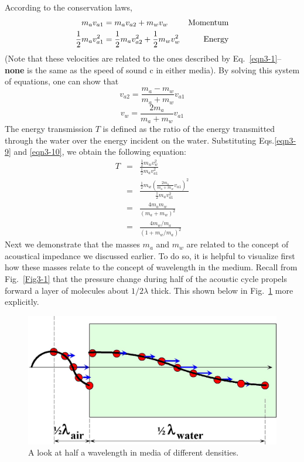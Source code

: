According to the conservation laws,
\begin{align}
m_av_{a1} &= m_av_{a2} + m_wv_w &{\rm Momentum}\nonumber\\
\frac{1}{2}m_av_{a1}^2 &= \frac{1}{2}m_av_{a2}^2 + \frac{1}{2}m_wv_w^2 &{\rm Energy}\nonumber
\end{align}
(Note that these velocities are related to the ones described by Eq.~\ref{eqn3-1}-- {\bf none} is the same as the speed of sound c in either media).  By solving this system of equations, one can show that
\begin{equation}\label{eqn3-9}
	v_{a2}=\frac{m_a-m_w}{m_a+m_w}v_{a1}
\end{equation}
\begin{equation}\label{eqn3-10}
	v_w=\frac{2m_a}{m_a+m_w}v_{a1}
\end{equation}
The energy transmission $T$ is defined as the ratio of the energy transmitted through the water over the energy incident on the water.  Substituting Eqs.\ref{eqn3-9} and \ref{eqn3-10}, we obtain the following equation:
\begin{eqnarray}\label{eqn3-11}
T &=& \frac{\frac{1}{2}m_wv_w^2}{\frac{1}{2}m_av_{a1}^2}\nonumber\\
&=& \frac{\frac{1}{2}m_w\left(\frac{2m_a}{m_a+m_w}v_{a1}\right)^2}{\frac{1}{2}m_av_{a1}^2}\nonumber\\
&=& \frac{4 m_a m_w}{\left(m_a+m_w\right)^2}\nonumber\\
&=& \frac{4 m_w/m_a}{\left(1+m_w/m_a\right)^2} 
\end{eqnarray}
Next we demonstrate that the masses $m_a$ and $m_w$ are related to the concept of acoustical impedance we discussed earlier. To do so, it is helpful to visualize first how these masses relate to the concept of wavelength in the medium. Recall from Fig.~\ref{Fig3-1} that the pressure change during half of the acoustic cycle propels forward a layer of molecules about $1/2\lambda$ thick. This shown below in Fig.~\ref{Fig3-6} more explicitly. 
\begin{figure}[htb]
	\centering
	\includegraphics[width=5in]{./figures/Topic3/Fig3-6.jpg}
	\caption{A look at half a wavelength in media of different densities.}
 	\label{Fig3-6}
 \end{figure}
